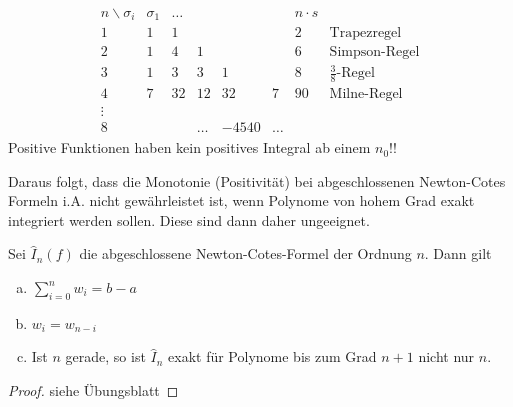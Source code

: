 \begin{align*}
  \begin{array}{cccccccl}
    n\backslash \sigma_i &\sigma_1&\dots&&&& n\cdot s\\
    1 & 1&1&&&&2& \text{Trapezregel}\\
    2&1&4&1&&&6 & \text{Simpson-Regel}\\
    3&1&3&3&1&&8& \text{$\frac{3}{8}$-Regel}\\
    4&7&32&12&32&7&90 & \text{Milne-Regel}\\
    \vdots\\
    8&&&\dots &-4540&\dots
  \end{array}
\end{align*}
Positive Funktionen haben kein positives Integral ab einem $n_0$!!




Daraus folgt, dass die Monotonie (Positivität) 
bei abgeschlossenen Newton-Cotes Formeln i.A. nicht gewährleistet ist,
wenn Polynome von hohem Grad exakt integriert werden sollen.
Diese sind dann daher ungeeignet.


\begin{Satze}\label{7.2.5}
  Sei $\hat{I}_n(f) $ die abgeschlossene Newton-Cotes-Formel
  der Ordnung $n$.
  Dann gilt
  \begin{enumerate}[a)]
  \item $\sum_{i=0}^nw_i= b-a$
  \item $w_i=w_{n-i}$
  \item Ist $n$ gerade, so ist $\hat{I}_n$ exakt für Polynome bis zum
    Grad $n+1$ nicht nur $n$.
  \end{enumerate}

  \begin{proof} siehe Übungsblatt \end{proof}
\end{Satze}

